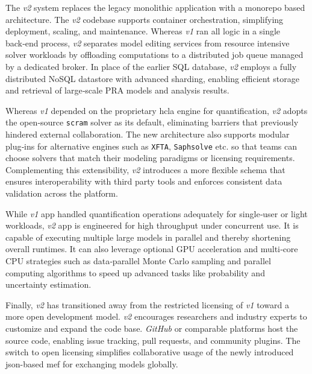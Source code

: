 The \textit{v2} system replaces the legacy monolithic application with a monorepo based architecture. The \textit{v2} codebase supports container orchestration, simplifying deployment, scaling, and maintenance. Whereas \textit{v1} ran all logic in a single back‑end process, \textit{v2} separates model editing services from resource intensive solver workloads by offloading computations to a distributed job queue managed by a dedicated broker. In place of the earlier SQL database, \textit{v2} employs a fully distributed NoSQL datastore with advanced sharding, enabling efficient storage and retrieval of large‑scale PRA models and analysis results.

Whereas \textit{v1} depended on the proprietary \acrshort{hcla} engine for quantification, \textit{v2} adopts the open‑source \texttt{scram} solver as its default, eliminating barriers that previously hindered external collaboration. The new architecture also supports modular plug‑ins for alternative engines such as \texttt{XFTA}, \texttt{Saphsolve} etc. so that teams can choose solvers that match their modeling paradigms or licensing requirements. Complementing this extensibility, \textit{v2} introduces a more flexible schema that ensures interoperability with third party tools and enforces consistent data validation across the platform.

While \textit{v1} app handled quantification operations adequately for single‑user or light workloads, \textit{v2} app is engineered for high throughput under concurrent use. It is capable of executing multiple large models in parallel and thereby shortening overall runtimes. It can also leverage optional GPU acceleration and multi‑core CPU strategies such as data‑parallel Monte Carlo sampling and parallel computing algorithms to speed up advanced tasks like probability and uncertainty estimation.

Finally, \textit{v2} has transitioned away from the restricted licensing of \textit{v1} toward a more open development model. \textit{v2} encourages researchers and industry experts to customize and expand the code base. \textit{GitHub} or comparable platforms host the source code, enabling issue tracking, pull requests, and community plugins. The switch to open licensing simplifies collaborative usage of the newly introduced \acrshort{json}-based \acrshort{mef} for exchanging models globally.